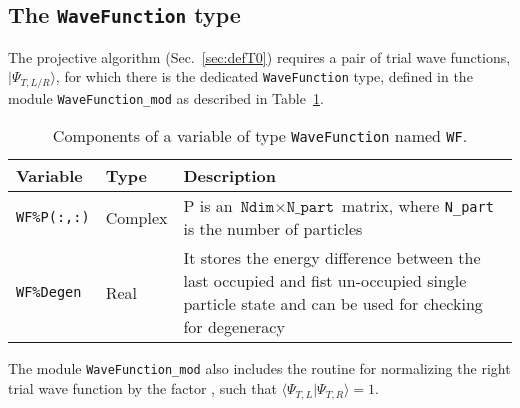 \subsection{The \texttt{WaveFunction} type} \label{sec:wave_function}

The projective algorithm (Sec.~\ref{sec:defT0}) requires a pair of trial wave functions,  $| \Psi_{T,L/R} \rangle $, for which there is the dedicated  \texttt{WaveFunction} type, defined in the module \texttt{WaveFunction\_mod} as described in Table~\ref{table:wavefunction}.
%
\begin{table}[h]
	\begin{center}
		\begin{tabular}{@{} p{} p{} p{}  @{}}\toprule
			Variable               &  Type     &  Description \\\midrule
			\texttt{WF\%P(:,:)}    &  Complex  &  P is an $\texttt{Ndim}\times\texttt{N\_part}$ matrix, where \texttt{N\_part} is the number of particles\\
			\texttt{WF\%Degen}     &  Real     &  It stores the energy difference between the last occupied and fist un-occupied single particle state and can be used for checking for degeneracy\\\bottomrule
		\end{tabular}
		\caption{Components of a variable of type \texttt{WaveFunction} named \texttt{WF}.}
		\label{table:wavefunction}
	\end{center}
\end{table}
%

The module \texttt{WaveFunction\_mod} also includes the routine  for normalizing the right trial wave function  by the factor , such that $\langle \Psi_{T,L} | \Psi_{T,R} \rangle = 1$.



